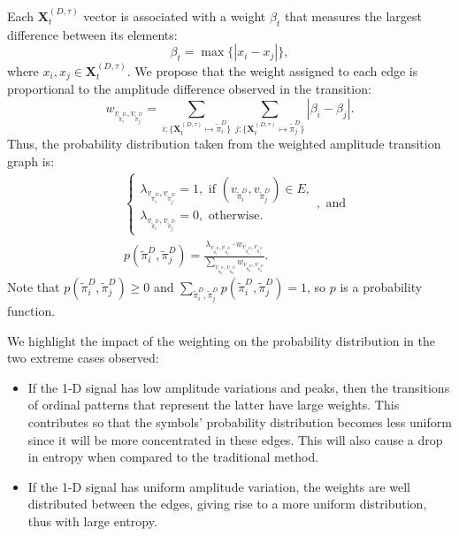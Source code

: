 \documentclass[a4,11pt]{pssbmac}
\begin{document}
	Each $\mathbf{X}^{(D, \tau)}_t$ vector is associated with a weight $\beta_t$ that measures the largest difference between its elements:
	\begin{equation}
		\beta_t = \max\{|x_i - x_j|\},
	\end{equation}
	where $x_i, x_j \in \mathbf{X}^{(D, \tau)}_t$.
	We propose that the weight assigned to each edge is proportional to the amplitude difference observed in the transition:	
	\begin{equation}
		w_{v_{\widetilde \pi^D_i}, v_{\widetilde \pi^D_j}} =  \sum_{i : \{\mathbf{X}^{(D,\tau)}_t \mapsto \widetilde\pi^D_i\}} \sum_{j : \{\mathbf{X}^{(D,\tau)}_t \mapsto \widetilde\pi^D_j\}} |\beta_i - \beta_j| .
	\end{equation}
	Thus, the probability distribution taken from the weighted amplitude transition graph is:	
	\begin{align}
		&\left\{\begin{array}{l}
			\lambda_{v_{\widetilde\pi^D_i}, v_{\widetilde\pi^D_j}} = 1, \text{ if } (v_{\widetilde\pi^D_i}, v_{\widetilde\pi^D_j}) \in {E}, \\
			\lambda_{v_{\widetilde\pi^D_i}, v_{\widetilde\pi^D_j}} = 0, \text{ otherwise}.
		\end{array}\right., \text{ and} \\
		&p(\widetilde\pi^D_i, \widetilde\pi^D_j) = \frac{\lambda_{v_{\widetilde\pi^D_i}, v_{\widetilde\pi^D_j}} \cdot w_{v_{\widetilde\pi^D_i}, v_{\widetilde\pi^D_j}}}{\sum_{v_{\widetilde\pi^D_a}, v_{\widetilde\pi^D_b}} w_{v_{\widetilde\pi^D_a}, v_{\widetilde\pi^D_b}}}.
	\end{align}
	Note that  $p(\widetilde\pi^D_i, \widetilde\pi^D_j) \ge 0$ and $\sum_{\widetilde\pi^D_i, \widetilde\pi^D_j} p(\widetilde\pi^D_i, \widetilde\pi^D_j) = 1$, so $p$ is a probability function.
	
	We highlight the impact of the weighting on the probability distribution in the two extreme cases observed:
	\begin{itemize}
		\item If the \mbox{1-D} signal has low amplitude variations and peaks, then the transitions of ordinal patterns that represent the latter have large weights.
		This contributes so that the symbols' probability distribution becomes less uniform since it will be more concentrated in these edges.
		This will also cause a drop in entropy when compared to the traditional method.
		\item If the \mbox{1-D} signal has uniform amplitude variation, the weights are well distributed between the edges, giving rise to a more uniform distribution, thus with large entropy.
	\end{itemize}
	
\end{document}
